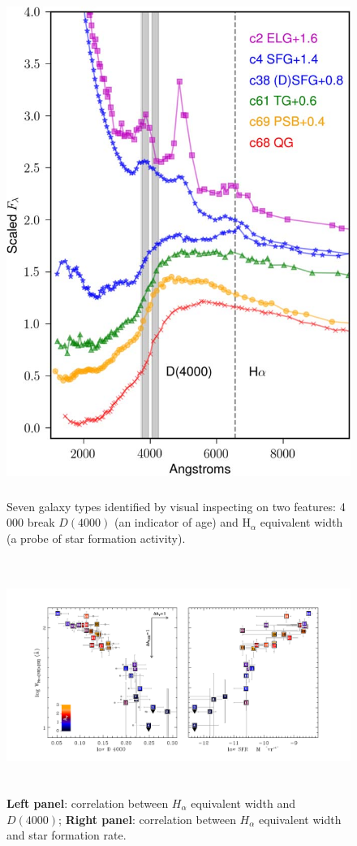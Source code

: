 \documentclass{ar-1col}
\begin{document}
\begin{figure}
    \includegraphics[width=5in, height=6.5in]{images/galaxy_types.png}
    \caption{Seven galaxy types identified by visual inspecting on two features: 4\,000 break $ D(4000) $ (an indicator of age) and H$_\alpha$ equivalent width (a probe of star formation activity).}
    \label{fig:seds}
\end{figure}

\begin{figure}
    \includegraphics[width=6in, height=3in]{images/correlation_Ha_D4000.pdf}
    \caption{\textbf{Left panel}: correlation between $H_\alpha$ equivalent width and $D(4000)$; \textbf{Right panel}: correlation between $H_\alpha$ equivalent width and star formation rate.}
    \label{fig:correlation_kreik}
\end{figure}
\end{document}
